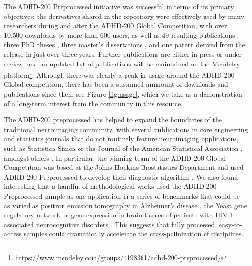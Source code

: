 \documentclass[preprint,12pt,3p]{elsarticle}
\begin{document}
The ADHD-200 Preprocessed initiative was successful in terms of its primary objectives: the derivatives shared in the repository were effectively used by many researchers during and after the ADHD-200 Global Competition, with over 10,500 downloads by more than 600 users, as well as 49 resulting publications \cite{Rangarajan2014, Liang2012, Tabas2014, Rangarajan2015, Mahanand2013, Lifshitz2012, Fujita2013, Ji2011, Li2015, Li2013, Liu2012, DosSantosSiqueira2014, Olivetti2014, Han2015, Wang2013a, Dey2014, Bellec2012, Bohland2012, Chang2012, Cheng2012, Colby2012, Dai2012, Dey2012, Eloyan2012, Olivetti2012, Sato2012a, Subramanian2013, Carmona2015, Hou2015, Deshpande2015, She2014, Lavoie-Courchesne2012b, Chen2015, Nunez-Garcia2015, Solmaz2012, Anderson2014, KadkhodaeianBakhtiari2012, Sato2013, Kyeong2015, Sato2012, Takahashi2012, He2013, Kong2013, Yao2013, Yang2015, Ahn2015, Fujita2014, Reiss2014}, three PhD theses \cite{Colby2012a, Dey2014phd, Zhang2012}, three master's dissertations \cite{VanGalenLast2011, Vidal2014, Wang2013}, and one patent \cite{Dey2013} derived from the release in just over three years. Further publications are either in press or under review, and an updated list of publications will be maintained on the Mendeley platform\footnote{\url{https://www.mendeley.com/groups/4198361/adhd-200-preprocessed/}}. Although there was clearly a peak in usage around the ADHD-200 Global competition, there has been a sustained ammount of downloads and publications since then, see Figure \ref{fig:usage}, which we take as a demonstration of a long-term interest from the community in this resource. 
\par
The ADHD-200 preprocessed has helped to expand the boundaries of the traditional neuroimaging community, with several publications in core engineering and statistics journals that do not routinely feature neuroimaging applications, such as Statistica Sinica \citep{Yang2015} or the Journal of the American Statistical Association \citep{Chen2015}, amongst others \citep[e.g.][]{Liang2012, Rangarajan2015, Rangarajan2014, Mahanand2013, Ji2011, Li2015, Li2013, Liu2012, Subramanian2013, Hou2015, Deshpande2015, She2014, He2013, Kong2013, Ahn2015}. In particular, the winning team of the ADHD-200 Global Competition was based at the Johns Hopkins Biostatistics Department and used ADHD-200 Preprocessed to develop their diagnostic algorithm \cite{Eloyan2012}. We also found interesting that a handful of methodological works used the ADHD-200 Preprocessed sample as one application in a series of benchmarks that could be as varied as positron emission tomography in Alzheimer's disease \citep{Yang2015}, the Yeast gene regulatory network \citep{She2014} or gene expression in brain tissues of patients with HIV-1 associated neurocognitive disorders \citep{Liu2012}. This suggests that fully processed, easy-to-access samples could dramatically accelerate the cross-polinization of disciplines.
\end{document}

